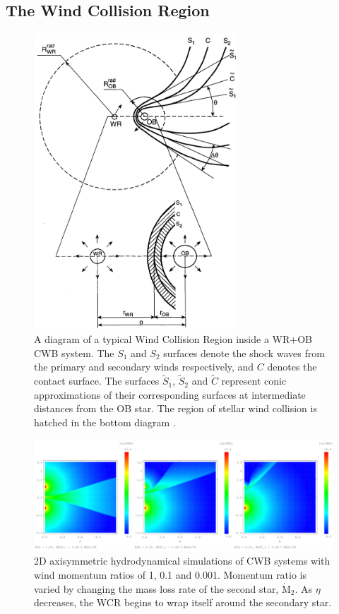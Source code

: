 \subsection{The Wind Collision Region}
\label{sec:wcr}

\begin{figure}
  \centering
  \includegraphics[width=3in]{assets/cwb-diagrams/eichler.png}
  \caption[\textit{A diagram of the Wind Collision Region \parencite{eichler_particle_1993}}]{A diagram of a typical Wind Collision Region inside a WR+OB CWB system. The $S_1$ and $S_2$ surfaces denote the shock waves from the primary and secondary winds respectively, and $C$ denotes the contact surface. The surfaces $\widetilde{S}_1$, $\widetilde{S}_2$ and $\widetilde{C}$ represent conic approximations of their corresponding surfaces at intermediate distances from the OB star. The region of stellar wind collision is hatched in the bottom diagram \parencite{eichler_particle_1993}.}
  \label{fig:wcr-diagram}
\end{figure}

\begin{figure}
  \centering
  \includegraphics[width=6in]{assets/cwb-diagrams/eta.png}
  \caption[Comparison of wind momentum ratio, $\eta$, on WCR strtucture]{2D axisymmetric hydrodynamical simulations of CWB systems with wind momentum ratios of \num{1}, \num{0.1} and \num{0.001}. Momentum ratio is varied by changing the mass loss rate of the second star, $\dot{\text{M}}_2$. As $\eta$ decreases, the WCR begins to wrap itself around the secondary star.}
  \label{fig:wcr-eta}
\end{figure}

